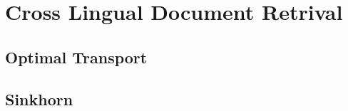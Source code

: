 \section{Cross Lingual Document Retrival}%
\label{sec:cross_lingual_document_retrival}

\subsection{Optimal Transport}%
\label{sub:optimal_transport}

\subsection{Sinkhorn}%
\label{sub:sinkhorn}






